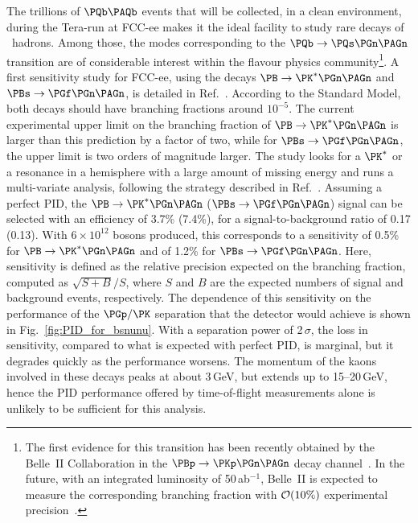 The trillions of $\PQb \PAQb$ events that will be collected, in a clean environment, 
during the Tera-\PZ run at FCC-ee makes it the ideal facility to study rare decays of \PQb~hadrons. 
Among those, the modes corresponding to the $\PQb \to \PQs \PGn \PAGn$ transition are of considerable interest within the flavour physics 
community\footnote{The first evidence for this transition has been recently obtained by the Belle~II Collaboration in the 
$\PBp \to \PKp \PGn \PAGn$ decay channel~\cite{BelleII-EPS2023}. 
In the future, with an integrated luminosity of 50\,ab$^{-1}$, 
Belle~II is expected to measure the corresponding branching fraction with ${\cal{O}}(10\%)$ experimental precision~\cite{Belle-II:2018jsg}.}. 
A first sensitivity study for FCC-ee, using the decays $\PB \to \PK^{*} \PGn \PAGn$ and $\PBs \to \PGf \PGn \PAGn$, is detailed in Ref.~\cite{Amhis:2023mpj}. 
According to the Standard Model, both decays should have branching fractions around $10^{-5}$. 
The current experimental upper limit on the branching fraction of $\PB \to \PK^{*} \PGn \PAGn$ is larger than this prediction by a factor of two, 
while for $\PBs \to \PGf \PGn \PAGn$, the upper limit is two orders of magnitude larger. 
The study looks for a $\PK^{*}$ or a \PGf resonance in a hemisphere with a large amount of missing energy and runs a multi-variate analysis, 
following the strategy described in Ref.~\cite{Zuo:2023dzn}. 
Assuming a perfect PID, the $\PB \to \PK^{*} \PGn \PAGn$ ($\PBs \to \PGf \PGn \PAGn$) signal can be selected with an efficiency of 3.7\% (7.4\%), 
for a signal-to-background ratio of 0.17 (0.13). 
With $6 \times 10^{12}$ \PZ bosons produced, 
this corresponds to a sensitivity of 0.5\% for $\PB \to \PK^{*} \PGn \PAGn$ and of 1.2\% for $\PBs \to \PGf \PGn \PAGn$. 
Here, sensitivity is defined as the relative precision expected on the branching fraction, computed as $\sqrt{S+B} / S$, 
where $S$ and $B$ are the expected numbers of signal and background events, respectively. 
The dependence of this sensitivity on the performance of the $\PGp/\PK$ separation that the detector would achieve is shown in Fig.~\ref{fig:PID_for_bsnunu}. 
With a separation power of 2\,$\sigma$, the loss in sensitivity, compared to what is expected with perfect PID, is marginal, 
but it degrades quickly as the performance worsens. 
The momentum of the kaons involved in these decays peaks at about 3\,GeV, but extends up to 15--20\,GeV, 
hence the PID performance offered by time-of-flight measurements alone is unlikely to be sufficient for this analysis.

